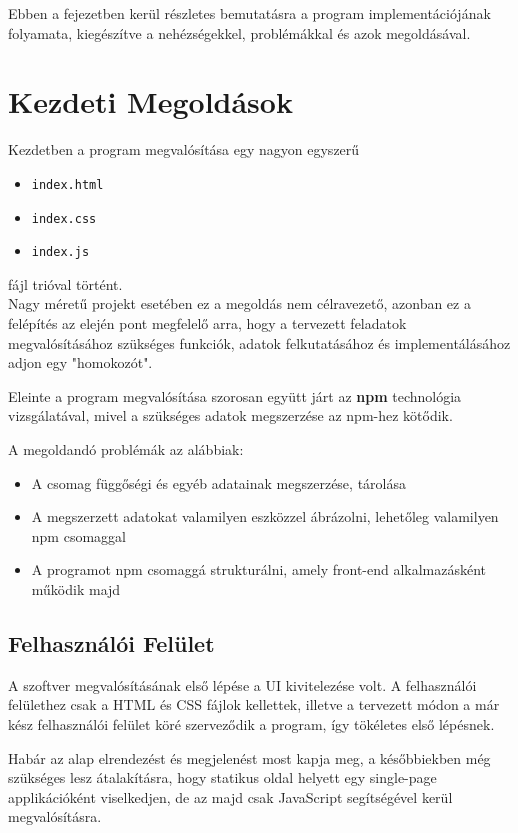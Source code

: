 
Ebben a fejezetben kerül részletes bemutatásra a program implementációjának folyamata, kiegészítve a nehézségekkel, problémákkal és azok megoldásával.

\section{Kezdeti Megoldások}

Kezdetben a program megvalósítása egy nagyon egyszerű
\begin{itemize}
	\item \texttt{index.html}
	\item \texttt{index.css}
	\item \texttt{index.js}
\end{itemize}
fájl trióval történt.\\

Nagy méretű projekt esetében ez a megoldás nem célravezető, azonban ez a felépítés az elején pont megfelelő arra, hogy a tervezett feladatok megvalósításához szükséges funkciók, adatok felkutatásához és implementálásához adjon egy "homokozót".

Eleinte a program megvalósítása szorosan együtt járt az \textbf{npm} technológia vizsgálatával, mivel a szükséges adatok megszerzése az npm-hez kötődik.

A megoldandó problémák az alábbiak:

\begin{itemize}
	\item A csomag függőségi és egyéb adatainak megszerzése, tárolása
	\item A megszerzett adatokat valamilyen eszközzel ábrázolni, lehetőleg valamilyen npm csomaggal
	\item A programot npm csomaggá strukturálni, amely front-end alkalmazásként működik majd
\end{itemize}


\subsection{Felhasználói Felület}

A szoftver megvalósításának első lépése a UI kivitelezése volt. A felhasználói felülethez csak a HTML és CSS fájlok kellettek, illetve a tervezett módon a már kész felhasználói felület köré szerveződik a program, így tökéletes első lépésnek.

Habár az alap elrendezést és megjelenést most kapja meg, a későbbiekben még szükséges lesz átalakításra, hogy statikus oldal helyett egy single-page applikációként viselkedjen, de az majd csak JavaScript segítségével kerül megvalósításra.

